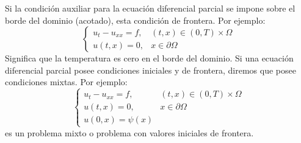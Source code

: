 Si la condición auxiliar para la ecuación diferencial parcial se impone sobre el borde del dominio (acotado), esta condición de frontera. Por ejemplo:
$$
\begin{cases}
    u_t-u_{x x}=f,
    & \mbox{$(t,x)\in (0,T)\times\Omega$}\\
    u(t,x)=0, & \mbox{$x\in\partial\Omega$}
\end{cases}
$$
Significa que la temperatura es cero en el borde del dominio. Si una ecuación diferencial parcial posee condiciones iniciales y de frontera, diremos que posee condiciones mixtas. Por ejemplo:$$
\begin{cases}
    u_t-u_{x x}=f,
    & \mbox{$(t,x)\in (0,T)\times\Omega$}\\
    u(t,x)=0, & \mbox{$x\in\partial\Omega$}\\
    u(0,x)=\psi(x)
\end{cases}
$$
es un problema mixto o problema con valores iniciales de frontera.